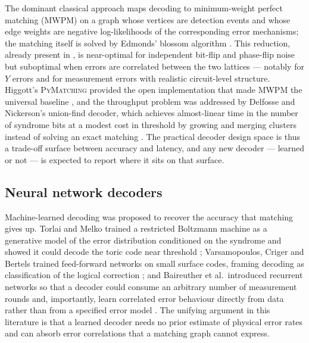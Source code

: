 \documentclass[Thesis.tex]{subfiles}
\begin{document}
The dominant classical approach maps decoding to minimum-weight perfect
matching (MWPM) on a graph whose vertices are detection events and whose edge
weights are negative log-likelihoods of the corresponding error mechanisms; the
matching itself is solved by Edmonds' blossom algorithm
\cite{edmonds1965paths}. This reduction, already present in
\cite{dennis2002topological}, is near-optimal for independent bit-flip and
phase-flip noise but suboptimal when errors are correlated between the two
lattices --- notably for $Y$ errors and for measurement errors with realistic
circuit-level structure. Higgott's \textsc{PyMatching} provided the open
implementation that made MWPM the universal baseline
\cite{higgott2022pymatching}, and the throughput problem was addressed by
Delfosse and Nickerson's union-find decoder, which achieves almost-linear
time in the number of syndrome bits at a modest cost in threshold by growing
and merging clusters instead of solving an exact matching
\cite{delfosse2021almost}. The practical decoder design space is thus a
trade-off surface between accuracy and latency, and any new decoder --- learned
or not --- is expected to report where it sits on that surface.

\subsection{Neural network decoders}

Machine-learned decoding was proposed to recover the accuracy that matching
gives up. Torlai and Melko trained a restricted Boltzmann machine as a
generative model of the error distribution conditioned on the syndrome and
showed it could decode the toric code near threshold \cite{torlai2017neural};
Varsamopoulos, Criger and Bertels trained feed-forward networks on small
surface codes, framing decoding as classification of the logical correction
\cite{varsamopoulos2018decoding}; and Baireuther et al.\ introduced recurrent
networks so that a decoder could consume an arbitrary number of measurement
rounds and, importantly, learn correlated error behaviour directly from data
rather than from a specified error model \cite{baireuther2018machine}. The
unifying argument in this literature is that a learned decoder needs no prior
estimate of physical error rates and can absorb error correlations that a
matching graph cannot express.
\end{document}
